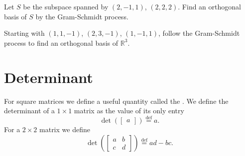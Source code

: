 \begin{exercise}
Let $S$ be the subspace spanned by
$(2,-1,1)$, $(2,2,2)$.  Find an orthogonal basis of $S$
by the Gram-Schmidt process.
\end{exercise}

\begin{exercise}
Starting with $(1,1,-1)$, $(2,3,-1)$, $(1,-1,1)$, follow the Gram-Schmidt
process to find an orthogonal basis of ${\mathbb{R}}^3$.
\end{exercise}


\sectionnewpage
\section{Determinant}
\label{det:section}


For square matrices we define a useful quantity called the
\emph{}.  We define
the determinant of a $1 \times 1$ matrix as the value of its only entry
\begin{equation*}
\det \left(
\begin{bmatrix}
a 
\end{bmatrix}
\right)
\overset{\text{def}}{=}
a .
\end{equation*}
For a $2 \times 2$ matrix we define
\begin{equation*}
\det \left(
\begin{bmatrix}
a & b \\
c & d
\end{bmatrix}
\right)
\overset{\text{def}}{=}
ad-bc .
\end{equation*}

